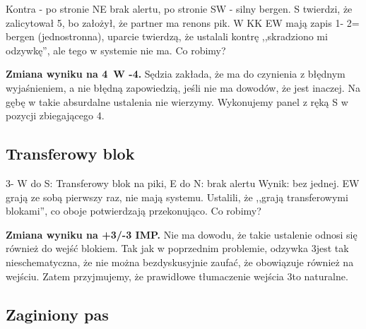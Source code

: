 \documentclass[12pt, a4paper]{article}
\newcounter{board}
\newcommand\nextboard{\stepcounter{board}\theboard}
\begin{document}
Kontra - po stronie NE brak alertu, po stronie SW - silny bergen.
S twierdzi, że zalicytował 5\diams, bo założył, że partner ma renons
pik. W KK EW mają zapis 1\spades - 2\hearts = bergen (jednostronna),
uparcie twierdzą, że ustalali kontrę ,,skradziono mi odzywkę'', ale tego w systemie nie ma.
Co robimy?

\textbf{Zmiana wyniku na 4\spades\dbl\ W -4.}
Sędzia zakłada, że ma do czynienia z błędnym wyjaśnieniem, a nie błędną zapowiedzią,
jeśli nie ma dowodów, że jest inaczej. Na gębę w takie absurdalne ustalenia nie wierzymy.
Wykonujemy panel z ręką S w pozycji zbiegającego 4\spades \dbl.



\subsection*{Transferowy blok}

\handdiagramv[\nextboard]{\vhand{A}{A6}{Q652}{AQJ854}}
				{}
                {}
                {}{}


3\hearts - W do S: Transferowy blok na piki, E do N: brak alertu
Wynik: bez jednej. EW grają ze sobą pierwszy raz, nie mają systemu.
Ustalili, że ,,grają transferowymi blokami'', co oboje potwierdzają przekonująco.
Co robimy?

\textbf{Zmiana wyniku na +3/-3 IMP.}
Nie ma dowodu, że takie ustalenie odnosi się również do wejść blokiem.
Tak jak w poprzednim problemie, odzywka 3\hearts jest tak nieschematyczna,
że nie można bezdyskusyjnie zaufać, że obowiązuje również na wejściu.
Zatem przyjmujemy, że prawidłowe tłumaczenie wejścia 3\hearts to naturalne.


\subsection*{Zaginiony pas}

\end{document}
